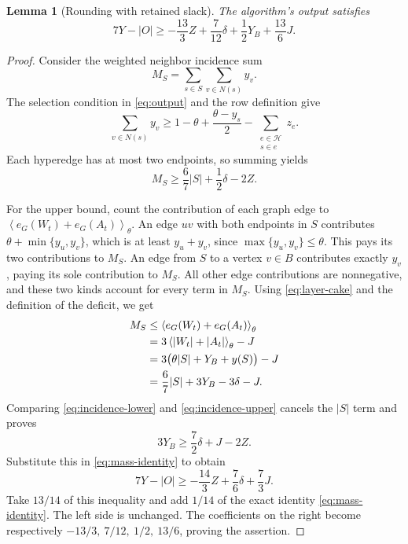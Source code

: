 \documentclass[11pt,a4paper]{article}
\newtheorem{lemma}[lemma]{Lemma}
\theoremstyle{definition}
\theoremstyle{remark}
\newcommand{\HH}{\mathcal H}
\newcommand{\avg}[2]{\left\langle #1\right\rangle_{#2}}
\begin{document}
\begin{lemma}[Rounding with retained slack]\label{lem:rounding}
The algorithm's output satisfies
\begin{equation}\label{eq:rounding-slack}
 7Y-|O|\geq
 -\frac{13}{3}Z+\frac7{12}\delta+\frac12Y_B+\frac{13}{6}J.
\end{equation}
\end{lemma}
\begin{proof}
Consider the weighted neighbor incidence sum
\[
 M_S=\sum_{s\in S}\sum_{v\in N(s)}y_v.
\]
The selection condition in \eqref{eq:output} and the row definition give
\[
 \sum_{v\in N(s)}y_v
 \geq1-\theta+\frac{\theta-y_s}{2}
       -\sum_{\substack{e\in\HH\\s\in e}}z_e .
\]
Each hyperedge has at most two endpoints, so summing yields
\begin{equation}\label{eq:incidence-lower}
 M_S\geq\frac67|S|+\frac12\delta-2Z.
\end{equation}

For the upper bound, count the contribution of each graph edge to
\(\avg{e_G(W_t)+e_G(A_t)}{\theta}\).
An edge \(uv\) with both endpoints in \(S\) contributes
\(\theta+\min\{y_u,y_v\}\), which is at least \(y_u+y_v\), since
\(\max\{y_u,y_v\}\leq\theta\). This pays its two contributions to \(M_S\).
An edge from \(S\) to a vertex \(v\in B\) contributes exactly \(y_v\),
paying its sole contribution to \(M_S\). All other edge contributions
are nonnegative, and these two kinds account for every term in \(M_S\).
Using \eqref{eq:layer-cake} and the definition of the deficit, we get
\begin{align}
 M_S
 &\leq\avg{e_G(W_t)+e_G(A_t)}{\theta}\notag\\
 &=3\avg{|W_t|+|A_t|}{\theta}-J\notag\\
 &=3\bigl(\theta|S|+Y_B+y(S)\bigr)-J\notag\\
 &=\frac67|S|+3Y_B-3\delta-J.
 \label{eq:incidence-upper}
\end{align}
Comparing \eqref{eq:incidence-lower} and \eqref{eq:incidence-upper}
cancels the \(|S|\) term and proves
\[
 3Y_B\geq\frac72\delta+J-2Z.
\]
Substitute this in \eqref{eq:mass-identity} to obtain
\[
 7Y-|O|\geq-\frac{14}{3}Z+\frac76\delta+\frac73J.
\]
Take \(13/14\) of this inequality and add \(1/14\) of the exact
identity \eqref{eq:mass-identity}. The left side is unchanged. The
coefficients on the right become respectively
\(-13/3,\ 7/12,\ 1/2,\ 13/6\), proving the assertion.
\end{proof}
\end{document}

